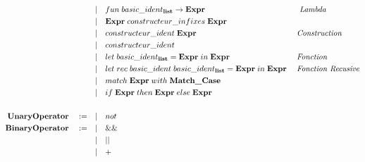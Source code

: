 \documentclass[
  12pt,
]{article}
\begin{document}
\begin{align*}
                                       & |\quad fun \; basic\_ident_{\bf{list}} \rightarrow  \textbf{Expr}                                    &  & \textit{ Lambda}           \\
                                       & |\quad \textbf{Expr}\; constructeur\_infixes\; \textbf{Expr}                                                                         \\
                                       & |\quad constructeur\_ident  \; \textbf{Expr}\;                                                       &  & \textit{Construction}      \\
                                       & |\quad constructeur\_ident                                                                                                           \\
                                       & |\quad let \; basic\_ident_{\bf{list}} = \textbf{Expr}\; in \; \textbf{Expr}                         &  & \textit{Fonction}          \\
                                       & |\quad let \; rec \; basic\_ident \; basic\_ident_{\bf{list}} = \textbf{Expr}\; in \;\textbf{Expr}\; &  & \textit{Fonction Recusive} \\
                                       & |\quad match \; \textbf{Expr}\; with \; \textbf{Match\_Case}\quad                                                                    \\
                                       & |\quad if \; \textbf{Expr}\; then \; \textbf{Expr}\; else \; \textbf{Expr}                                                           \\
  \\
  \bf{UnaryOperator}  \quad :=  \quad  & |\quad  not                                                                                                                          \\
  \bf{BinaryOperator}  \quad :=  \quad & |\quad \&\&                                                                                                                          \\
                                       & |\quad ||                                                                                                                            \\
                                       & |\quad +                                                                                                                             \\

\end{align*}
\end{document}
